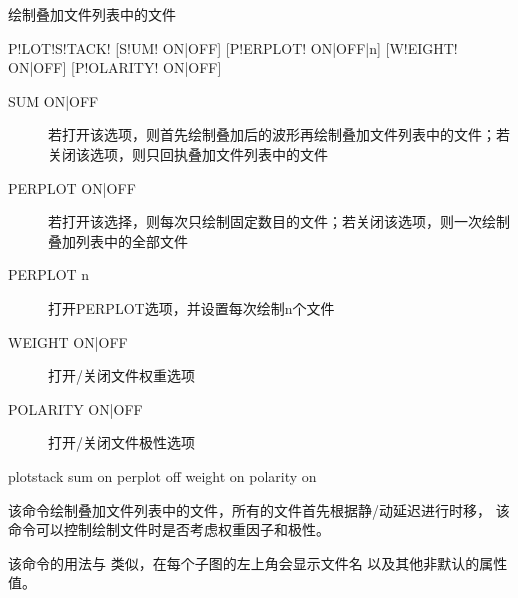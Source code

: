 \label{sss:plotstack}

绘制叠加文件列表中的文件

\begin{SACSTX}
P!LOT!S!TACK! [S!UM! ON|OFF] [P!ERPLOT! ON|OFF|n] [W!EIGHT! ON|OFF] [P!OLARITY! ON|OFF]
\end{SACSTX}

\begin{description}
\item [SUM ON|OFF] 若打开该选项，则首先绘制叠加后的波形再绘制叠加文件列表中的文件；若关闭该选项，则只回执叠加文件列表中的文件
\item [PERPLOT ON|OFF] 若打开该选择，则每次只绘制固定数目的文件；若关闭该选项，则一次绘制叠加列表中的全部文件
\item [PERPLOT n] 打开PERPLOT选项，并设置每次绘制n个文件
\item [WEIGHT ON|OFF] 打开/关闭文件权重选项
\item [POLARITY ON|OFF] 打开/关闭文件极性选项
\end{description}

\begin{SACDFT}
plotstack sum on perplot off weight on polarity on
\end{SACDFT}

该命令绘制叠加文件列表中的文件，所有的文件首先根据静/动延迟进行时移，
该命令可以控制绘制文件时是否考虑权重因子和极性。

该命令的用法与  类似，在每个子图的左上角会显示文件名
以及其他非默认的属性值。
